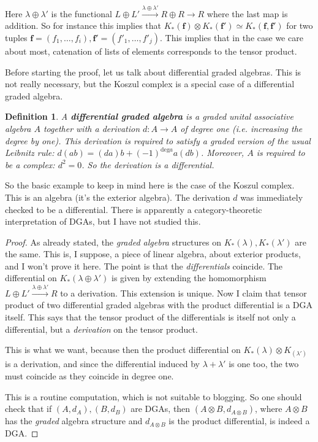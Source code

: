 \documentclass{article}
\newtheorem{definition}{Definition}
\begin{document}
Here $\lambda \oplus \lambda'$ is the functional $L \oplus L' \stackrel{\lambda
\oplus \lambda'}{\to} R \oplus R \to R$ where the last map is addition. So for
instance this implies that $K_*(\mathbf{f}) \otimes K_*(\mathbf{f}') \simeq
K_*(\mathbf{f}, \mathbf{f}')$ for two tuples $\mathbf{f} = (f_1, \dots, f_i),
\mathbf{f}' = (f'_1, \dots, f'_j)$. This implies that in the case we care about
most, catenation of lists of elements corresponds to the tensor product.

Before starting the proof, let us talk about differential graded algebras. This
is not really necessary, but the Koszul complex is a special case of a
differential graded algebra.

\begin{definition} 
A \textbf{differential graded algebra} is a graded  unital associative algebra
$A$ together with a derivation $d: A \to A$ of degree one (i.e. increasing the
degree by one). 
This derivation is required to satisfy a graded version of the usual Leibnitz
rule: $d(ab) = (da)b + (-1)^{\mathrm{deg} a} a (db) $.
Moreover, $A$ is required to be a complex: $d^2=0$. So the derivation is a
differential.
\end{definition} 

So the basic example to keep in mind here is the case of the Koszul complex.
This is an algebra  (it's the exterior algebra). The derivation $d$ was
immediately checked to be a differential. 
There is apparently a category-theoretic interpretation of DGAs, but I have not
studied this. 

\begin{proof} 
As already stated, the \emph{graded algebra} structures on $K_*(\lambda),
K_*(\lambda')$ are the same. This is, I suppose, a piece of linear algebra,
about exterior products, and
I won't prove it here. The point is that the \emph{differentials } coincide. 
The differential on $K_*(\lambda \oplus \lambda')$ is given by extending the
homomorphism $L
\oplus L' \stackrel{\lambda \oplus \lambda'}{\to} R$ to a derivation. This
extension is unique. 
Now I claim that  tensor product of two differential graded algebras with the
product differential is a DGA itself. This says that the tensor product of the
differentials is itself not only a differential, but a \emph{derivation}  on
the tensor product. 

This is what we want, because then the product differential on $K_*(\lambda)
\otimes K_(\lambda')$ is a derivation, and since the differential induced by
$\lambda + \lambda'$ is one too, the two must coincide as they coincide in
degree one. 

This is a routine computation, which is not suitable to blogging. So one should
check that if $(A, d_A), (B, d_B)$ are DGAs, then $(A \otimes B, d_{A \otimes
B})$, where $A \otimes B$ has the \emph{graded} algebra structure and $d_{A
\otimes B}$ is the product differential, is indeed a DGA. 
\end{proof} 
\end{document}
